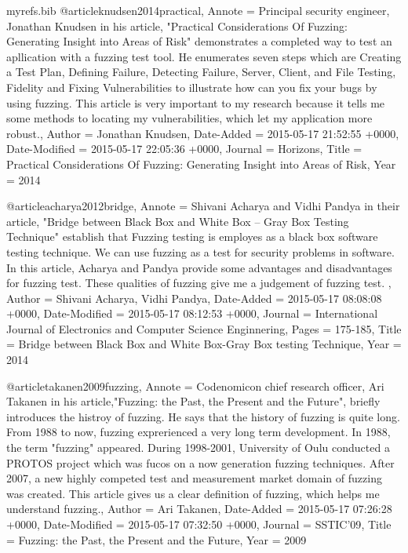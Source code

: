 
\RequirePackage{filecontents}
\begin{filecontents}{myrefs.bib}
@article{knudsen2014practical,
	Annote = {Principal security engineer, Jonathan Knudsen in his article, "Practical Considerations Of Fuzzing: Generating Insight into Areas of Risk" demonstrates a completed way to test an apllication with a fuzzing test tool. He enumerates seven steps which are Creating a Test Plan, Defining Failure, Detecting Failure, Server, Client, and File Testing, Fidelity and Fixing Vulnerabilities to illustrate how can you fix your bugs by using fuzzing. This article is very important to my research because it tells me some methods to locating my vulnerabilities, which  let my application more robust.},
	Author = {Jonathan Knudsen},
	Date-Added = {2015-05-17 21:52:55 +0000},
	Date-Modified = {2015-05-17 22:05:36 +0000},
	Journal = {Horizons},
	Title = {Practical Considerations Of Fuzzing: Generating Insight into Areas of Risk},
	Year = {2014}}

@article{acharya2012bridge,
	Annote = {Shivani Acharya and Vidhi Pandya in their article, "Bridge between Black Box and White Box -- Gray Box Testing Technique" establish that Fuzzing testing is employes as a black box software testing technique. We can use fuzzing as a test for security problems in software. In this article, Acharya and Pandya provide some advantages and disadvantages for fuzzing test. These qualities of fuzzing give me a judgement of fuzzing test. },
	Author = {Shivani Acharya, Vidhi Pandya},
	Date-Added = {2015-05-17 08:08:08 +0000},
	Date-Modified = {2015-05-17 08:12:53 +0000},
	Journal = {International Journal of Electronics and Computer Science Enginnering},
	Pages = {175-185},
	Title = {Bridge between Black Box and White Box-Gray Box testing Technique},
	Year = {2014}}

@article{takanen2009fuzzing,
	Annote = {Codenomicon chief research officer, Ari Takanen in his article,"Fuzzing: the Past, the Present and the Future", briefly introduces the histroy of fuzzing. He says that the history of fuzzing is quite long. From 1988 to now, fuzzing exprerienced a very long term development.  In 1988, the term "fuzzing" appeared. During 1998-2001, University of Oulu conducted a PROTOS project which was fucos on a now generation fuzzing techniques. After 2007, a new highly competed test and measurement market domain of fuzzing was created. This article gives us a clear definition of fuzzing, which helps me understand fuzzing.},
	Author = {Ari Takanen},
	Date-Added = {2015-05-17 07:26:28 +0000},
	Date-Modified = {2015-05-17 07:32:50 +0000},
	Journal = {SSTIC'09},
	Title = {Fuzzing: the Past, the Present and the Future},
	Year = {2009}}


\end{filecontents}

